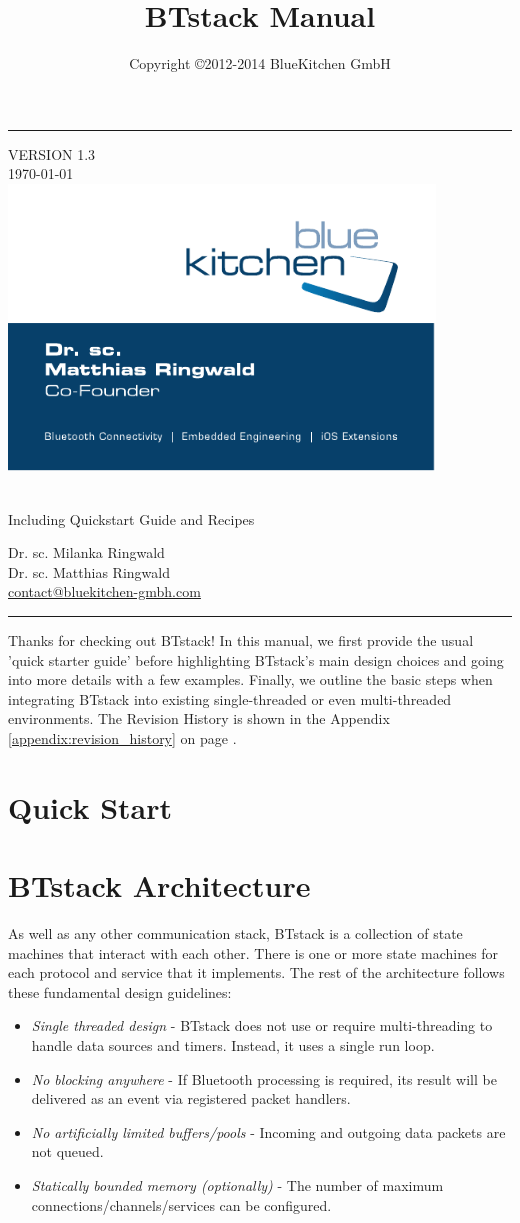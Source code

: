 \documentclass[a4paper,titlepage,oneside,12pt]{amsart} %
\title[BTstack Manual] {BTstack Manual}
\author{Copyright \copyright 2012-2014 BlueKitchen GmbH}
\makeatletter
\newcommand{\versionNr}{1.3}
\newcommand{\authorMila}{Dr. sc. Milanka Ringwald}
\newcommand{\authorMatthias}{Dr. sc. Matthias Ringwald}
\newcommand{\bkContact}{\href{contact@bluekitchen-gmbh.com}{contact@bluekitchen-gmbh.com}}
\newcommand{\barWidth}{0.3cm}
\renewcommand{\maketitle}{
  \begin{titlepage}
    \fosfamily
    \begin{center}
    \begin{minipage}[b]{\textwidth}
        \begin{minipage}[b]{.1\textwidth}
            \color{bkblue}\rule{\barWidth{}}{22cm}
        \end{minipage}
        \hfill\begin{minipage}[b]{.8\textwidth}\begin{flushright}
            {\color{bkblue}VERSION \versionNr{} \\
            \today \\}
            \vspace*{7.5cm}
            \hfill\includegraphics[width=0.85\textwidth]{picts/bklogo.pdf}
            \vspace*{1.5cm}
            \begin{spacing}{2} 
                {\huge \color{bkblue} \@title} \\ 
                {\Large \color{bklightblue} Including Quickstart Guide and Recipes}   
            \end{spacing} 
            \vspace*{1.5cm}
            {\color{bkblue}\large \authorMila \\
            \large \authorMatthias \\
            \large \bkContact\\ }
        \end{flushright}\end{minipage}
        \vfill
        \begin{minipage}[b]{\textwidth}
            \color{bklightblue}\rule{\barWidth{}}{\barWidth{}}
        \end{minipage}
    \end{minipage}

    
    \end{center}
  \end{titlepage}
}
\makeatother
\begin{document}
\maketitle

\tableofcontents
\pagebreak


Thanks for checking out BTstack! In this manual, we first provide the usual 'quick starter guide' before highlighting BTstack's main design choices and going into more details with a few examples. Finally, we outline the basic steps when integrating BTstack into existing single-threaded or even multi-threaded environments. The Revision History is shown in the Appendix \ref{appendix:revision_history} on page \pageref{appendix:revision_history}.

\section{Quick Start}


\section{BTstack Architecture}

As well as any other communication stack, BTstack is a collection of state machines that interact with each other. There is one or more state machines for each protocol and service that it implements. The rest of the architecture follows these fundamental design guidelines:

\begin{itemize}
\item \emph{Single threaded design} - BTstack does not use or require multi-threading to handle data sources and timers. Instead, it uses a single run loop.
\item \emph{No blocking anywhere} - If Bluetooth processing is required, its result will be delivered as an event via registered packet handlers.
\item \emph{No artificially limited buffers/pools} - Incoming and outgoing data packets are not queued.
\item \emph{Statically bounded memory (optionally)} - The number of maximum connections/channels/services can be configured.
\end{itemize}
\end{document}
